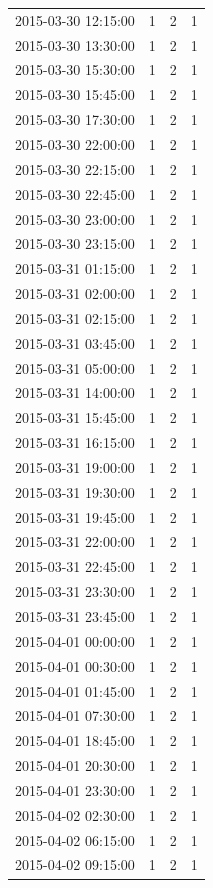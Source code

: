 \begin{tabular}{lrrr}
2015-03-30 12:15:00 & 1 & 2 & 1 \\
2015-03-30 13:30:00 & 1 & 2 & 1 \\
2015-03-30 15:30:00 & 1 & 2 & 1 \\
2015-03-30 15:45:00 & 1 & 2 & 1 \\
2015-03-30 17:30:00 & 1 & 2 & 1 \\
2015-03-30 22:00:00 & 1 & 2 & 1 \\
2015-03-30 22:15:00 & 1 & 2 & 1 \\
2015-03-30 22:45:00 & 1 & 2 & 1 \\
2015-03-30 23:00:00 & 1 & 2 & 1 \\
2015-03-30 23:15:00 & 1 & 2 & 1 \\
2015-03-31 01:15:00 & 1 & 2 & 1 \\
2015-03-31 02:00:00 & 1 & 2 & 1 \\
2015-03-31 02:15:00 & 1 & 2 & 1 \\
2015-03-31 03:45:00 & 1 & 2 & 1 \\
2015-03-31 05:00:00 & 1 & 2 & 1 \\
2015-03-31 14:00:00 & 1 & 2 & 1 \\
2015-03-31 15:45:00 & 1 & 2 & 1 \\
2015-03-31 16:15:00 & 1 & 2 & 1 \\
2015-03-31 19:00:00 & 1 & 2 & 1 \\
2015-03-31 19:30:00 & 1 & 2 & 1 \\
2015-03-31 19:45:00 & 1 & 2 & 1 \\
2015-03-31 22:00:00 & 1 & 2 & 1 \\
2015-03-31 22:45:00 & 1 & 2 & 1 \\
2015-03-31 23:30:00 & 1 & 2 & 1 \\
2015-03-31 23:45:00 & 1 & 2 & 1 \\
2015-04-01 00:00:00 & 1 & 2 & 1 \\
2015-04-01 00:30:00 & 1 & 2 & 1 \\
2015-04-01 01:45:00 & 1 & 2 & 1 \\
2015-04-01 07:30:00 & 1 & 2 & 1 \\
2015-04-01 18:45:00 & 1 & 2 & 1 \\
2015-04-01 20:30:00 & 1 & 2 & 1 \\
2015-04-01 23:30:00 & 1 & 2 & 1 \\
2015-04-02 02:30:00 & 1 & 2 & 1 \\
2015-04-02 06:15:00 & 1 & 2 & 1 \\
2015-04-02 09:15:00 & 1 & 2 & 1 \\

\end{tabular}
